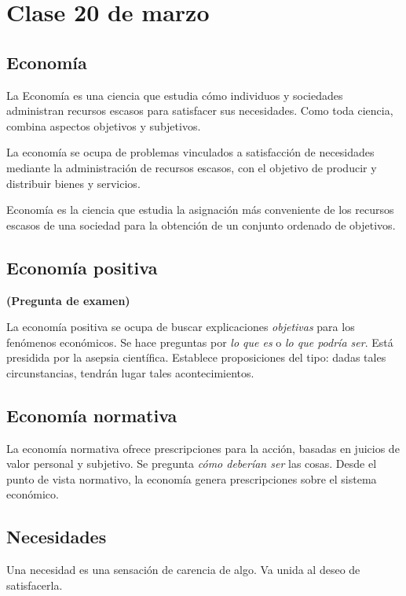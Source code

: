 \section{Clase 20 de marzo}

\subsection{Economía}

La Economía es una ciencia que estudia 
cómo individuos y sociedades administran recursos escasos 
para satisfacer sus necesidades.
Como toda ciencia,
combina aspectos objetivos y subjetivos.

La economía se ocupa de problemas vinculados a satisfacción de necesidades
mediante la administración de recursos escasos,
con el objetivo de producir y distribuir bienes y servicios.

Economía es la ciencia que estudia la asignación más conveniente 
de los recursos escasos de una sociedad 
para la obtención de un conjunto ordenado de objetivos.

\subsection{Economía positiva}

\textbf{(Pregunta de examen)}

La economía positiva se ocupa de buscar explicaciones \textit{objetivas} 
para los fenómenos económicos.
Se hace preguntas por \textit{lo que es} o \textit{lo que podría ser}.
Está presidida por la asepsia científica.
Establece proposiciones del tipo:
dadas tales circunstancias,
tendrán lugar tales acontecimientos.

\subsection{Economía normativa}

La economía normativa ofrece prescripciones para la acción,
basadas en juicios de valor personal y subjetivo.
Se pregunta \textit{cómo deberían ser} las cosas.
Desde el punto de vista normativo, 
la economía genera prescripciones
sobre el sistema económico.

\subsection{Necesidades}

Una necesidad es una sensación de carencia de algo.
Va unida al deseo de satisfacerla.

